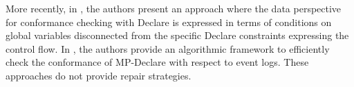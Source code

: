 More recently, in \cite{Borrego014}, the authors present an approach where the data perspective for conformance checking with Declare is expressed in terms of conditions on global variables disconnected from the specific Declare constraints expressing the control flow. In \cite{BurattinMS16}, the authors provide an algorithmic framework to efficiently check the conformance of MP-Declare with respect to event logs. These approaches do not provide repair strategies. 